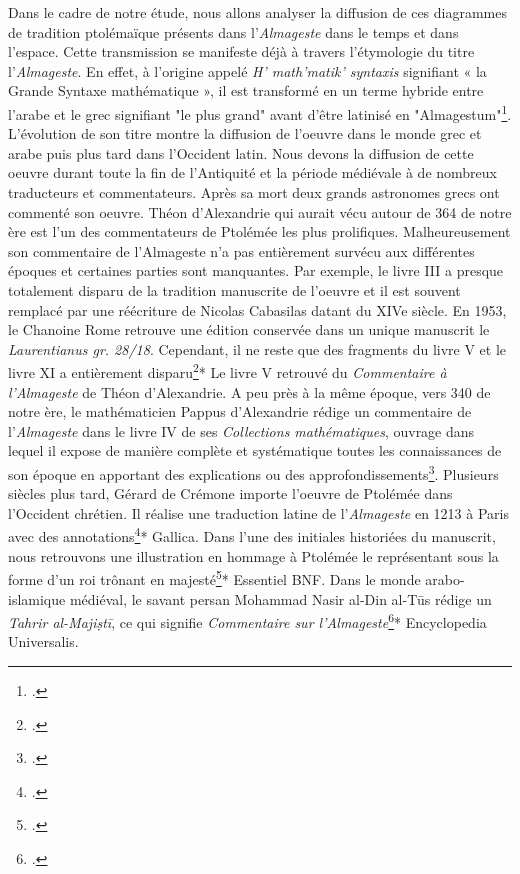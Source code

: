 \documentclass[a4paper,12pt,twoside]{book}
\begin{document}
	Dans le cadre de notre étude, nous allons analyser la diffusion de ces diagrammes de tradition ptolémaïque présents dans l'\textit{Almageste} dans le temps et dans l'espace. Cette transmission se manifeste déjà à travers l'étymologie du titre l'\textit{Almageste}. En effet, à l'origine appelé \textit{H' math'matik' syntaxis} signifiant « la Grande Syntaxe mathématique », il est transformé en un terme hybride entre l'arabe et le grec signifiant "le plus grand" avant d'être latinisé en "Almagestum"\footcite{raymondjonesPtolemyAccomplishmentsBiography2025}. L'évolution de son titre montre la diffusion de l'oeuvre dans le monde grec et arabe puis plus tard dans l'Occident latin. Nous devons la diffusion de cette oeuvre durant toute la fin de l'Antiquité et la période médiévale à de nombreux traducteurs et commentateurs. Après sa mort deux grands astronomes grecs ont commenté son oeuvre. Théon d'Alexandrie qui aurait vécu autour de 364 de notre ère est l'un des commentateurs de Ptolémée les plus prolifiques. Malheureusement son commentaire de l'Almageste n'a pas entièrement survécu aux différentes époques et certaines parties sont manquantes. Par exemple, le livre III a presque totalement disparu de la tradition manuscrite de l'oeuvre et il est souvent remplacé par une réécriture de Nicolas Cabasilas datant du XIVe siècle. En 1953, le Chanoine Rome retrouve une édition conservée dans un unique manuscrit le \textit{Laurentianus gr. 28/18}. Cependant, il ne reste que des fragments du livre V et le livre XI a entièrement disparu\footcite{tihonLivreRetrouveCommentaire1987}* Le livre V retrouvé du \textit{Commentaire à l'Almageste} de Théon d'Alexandrie. A peu près à la même époque, vers 340 de notre ère, le mathématicien Pappus d'Alexandrie rédige un commentaire de l'\textit{Almageste} dans le livre IV de ses \textit{Collections mathématiques}, ouvrage dans lequel il expose de manière complète et systématique toutes les connaissances de son époque en apportant des explications ou des approfondissements\footcite{meyerPAPPUS1999}. Plusieurs siècles plus tard, Gérard de Crémone importe l'oeuvre de Ptolémée dans l'Occident chrétien. Il réalise une traduction latine de l'\textit{Almageste} en 1213 à Paris avec des annotations\footcite{ptolemaeusPtolomeusAlmagestumTransl1213}* Gallica. Dans l'une des initiales historiées du manuscrit, nous retrouvons une illustration en hommage  à Ptolémée le représentant sous la forme d'un roi trônant en majesté\footcite{TraductionLatineLAlmageste}* Essentiel BNF. Dans le monde arabo-islamique médiéval, le savant persan Mohammad Nasir al-Din al-Tūs rédige un \textit{Tahrir al-Majiṣtī}, ce qui signifie \textit{Commentaire sur l'Almageste}\footcite{universalisMOHAMMADNASIRALDIN2008}* Encyclopedia Universalis. 
\end{document}
